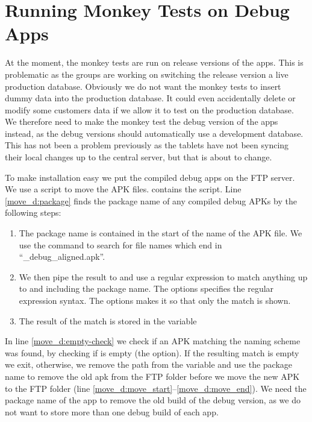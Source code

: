 \chapter{Running Monkey Tests on Debug Apps}
At the moment, the monkey tests are run on release versions of the apps. This is problematic as the \db groups are working on switching the release version a live production database. Obviously we do not want the monkey tests to insert dummy data into the production database. It could even accidentally delete or modify some customers data if we allow it to test on the production database. We therefore need to make the monkey test the debug version of the apps instead, as the debug versions should automatically use a development database. This has not been a problem previously as the tablets have not been syncing their local changes up to the central server, but that is about to change.

To make installation easy we put the compiled debug apps on the FTP server. We use a  script to move the APK files.  contains the script. Line \ref{move_d:package} finds the package name of any compiled debug APKs by the following steps:

\begin{enumerate}
  \item The package name is contained in the start of the name of the APK file. We use the  command to search for file names which end in ``\_debug\_aligned.apk''.
  \item We then pipe the result to  and use a regular expression to match anything up to and including the package name. The  options specifies the regular expression syntax. The  options makes it so that only the match is shown.
  \item The result of the match is stored in the variable 
\end{enumerate}

In line \ref{move_d:empty-check} we check if an APK matching the naming scheme was found, by checking if  is empty (the  option). If the resulting match is empty we exit, otherwise, we remove the path from the variable  and use the package name to remove the old apk from the FTP folder before we move the new APK to the FTP folder (line \ref{move_d:move_start}--\ref{move_d:move_end}). We need the package name of the app to remove the old build of the debug version, as we do not want to store more than one debug build of each app.

